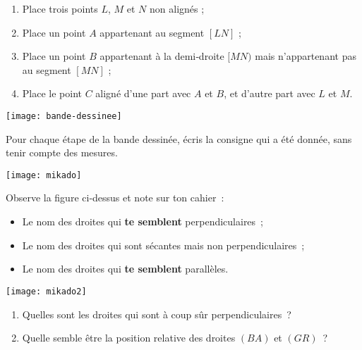 \begin{exercice}
\begin{enumerate} 
 \item Place trois points $L$, $M$ et $N$ non alignés ;
 \item Place un point $A$ appartenant au segment $[LN]$ ;
 \item Place un point $B$ appartenant à la demi‑droite $[MN)$ mais n'appartenant pas au segment $[MN]$ ;
 \item Place le point $C$ aligné d'une part avec $A$ et $B$, et d'autre part avec $L$ et $M$.
 \end{enumerate}
\end{exercice}



\vspace{1em}



\begin{exercice}
 \begin{center} \texttt{[image: bande-dessinee]}  \end{center}
Pour chaque étape de la bande dessinée, écris la consigne qui a été donnée, sans tenir compte des mesures.
\end{exercice}



\begin{exercice}
 \begin{center} \texttt{[image: mikado]}  \end{center}
Observe la figure ci‑dessus et note sur ton cahier :
\begin{itemize}
 \item Le nom des droites qui \textbf{te semblent} perpendiculaires ;
 \item Le nom des droites qui sont sécantes mais non perpendiculaires ;
 \item Le nom des droites qui \textbf{te semblent} parallèles.
 \end{itemize}
\end{exercice}


\begin{exercice}
 \begin{center} \texttt{[image: mikado2]}  \end{center}
\begin{enumerate}
 \item Quelles sont les droites qui sont à coup sûr perpendiculaires ?
 \item Quelle semble être la position relative des droites $(BA)$ et $(GR)$ ?
 \end{enumerate}
\end{exercice}


